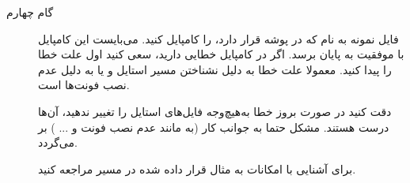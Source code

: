\documentclass{report}
\begin{document}
\begin{description}
\item[گام چهارم]
فایل نمونه به نام
 که در پوشه 
قرار دارد، را کامپایل کنید. می‌بایست این کامپایل با موفقیت به پایان برسد. اگر در کامپایل خطایی دارید، سعی کنید اول علت خطا را پیدا کنید. معمولا علت خطا به دلیل نشناختن مسیر استایل و یا به دلیل عدم نصب فونت‌ها است. 
\begin{warning}
دقت کنید در صورت بروز خطا به‌هیچ‌وجه فایل‌های استایل را تغییر ندهید، آن‌ها درست هستند. مشکل حتما به جوانب کار (به مانند عدم نصب فونت و ... ) بر می‌گردد. 
\end{warning}
\begin{note}
برای آشنایی با امکانات 
 به مثال قرار داده شده در مسیر 
مراجعه کنید. 
\end{note}
\end{description}
\end{document}
